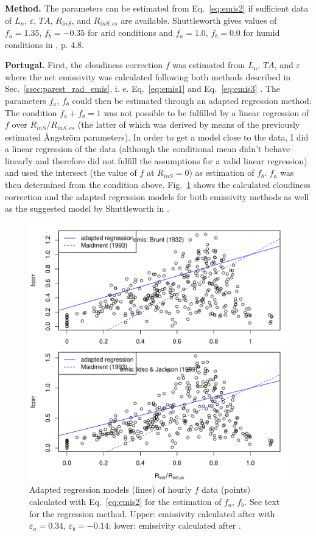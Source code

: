 \documentclass{scrreprt}
\begin{document}
\textbf{Method.}
The parameters can be estimated from Eq.~\eqref{eq:emis2} if sufficient data of $L_n$, $\varepsilon$, $TA$, $R_{inS}$, and $R_{inS,cs}$ are available.
Shuttleworth gives values of $f_a = 1.35$, $f_b = -0.35$ for arid conditions and $f_a = 1.0$, $f_b = 0.0$ for humid conditions in \citet{maidment93}, p. 4.8.

\textbf{Portugal.}
First, the cloudiness correction $f$ was estimated from $L_n$, $TA$, and $\varepsilon$ where the net emissivity was calculated following both methods described in Sec.~\ref{ssec:parest_rad_emis}, i. e. Eq.~\eqref{eq:emis1} \citep{brunt32} and Eq.~\eqref{eq:emis3} \citep{idso69}.
The parameters $f_a$, $f_b$ could then be estimated through an adapted regression method:
The condition $f_a + f_b = 1$ was not possible to be fulfilled by a linear regression of $f$ over $R_{inS}/R_{inS,cs}$ (the latter of which was derived by means of the previously estimated {\AA}ngstr\"om parameters).
In order to get a model close to the data, I did a linear regression of the data (although the conditional mean didn't behave linearly and therefore did not fulfill the assumptions for a valid linear regression) and used the intersect (the value of $f$ at $R_{inS} = 0$) as estimation of $f_b$.
$f_a$ was then determined from the condition above.
Fig.~\ref{fig:portugal_fcorr} shows the calculated cloudiness correction and the adapted regression models for both emissivity methods as well as the suggested model by Shuttleworth in \citet{maidment93}.

\begin{figure}[ht]
  \centering
  \includegraphics[width=0.6\hsize]{./plot_fcorr_both.pdf}
  \caption{Adapted regression models (lines) of hourly $f$ data (points) calculated with Eq.~\eqref{eq:emis2} for the estimation of $f_a$, $f_b$.
           See text for the regression method.
           Upper: emissivity calculated after \citet{brunt32} with $\varepsilon_a = 0.34$, $\varepsilon_b = -0.14$; lower: emissivity calculated after \citet{idso69}.}
  \label{fig:portugal_fcorr}
\end{figure}
\end{document}

